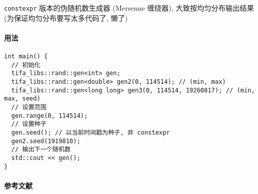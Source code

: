 \verb|constexpr| 版本的伪随机数生成器 (Mersenne 缠绕器), 大致按均匀分布输出结果 (为保证均匀分布要写太多代码了, 懒了)

\paragraph{用法}

\begin{verbatim}
int main() {
  // 初始化
  tifa_libs::rand::gen<int> gen;
  tifa_libs::rand::gen<double> gen2(0, 114514); // (min, max)
  tifa_libs::rand::gen<long long> gen3(0, 114514, 19260817); // (min, max, seed)
  // 设置范围
  gen.range(0, 114514);
  // 设置种子
  gen.seed(); // 以当前时间戳为种子, 非 constexpr
  gen2.seed(1919810);
  // 输出下一个随机数
  std::cout << gen();
}
\end{verbatim}

\paragraph{参考文献} \cite{matsumoto1998mersenne} \cite{szHugyi2013random} \cite{lemire2019fast}
